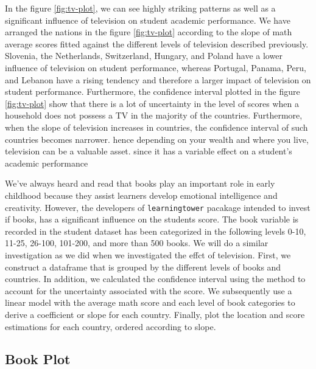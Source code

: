 In the figure \ref{fig:tv-plot}, we can see highly striking patterns as
well as a significant influence of television on student academic
performance. We have arranged the nations in the figure
\ref{fig:tv-plot} according to the slope of math average scores fitted
against the different levels of television described previously.
Slovenia, the Netherlands, Switzerland, Hungary, and Poland have a lower
influence of television on student performance, whereas Portugal,
Panama, Peru, and Lebanon have a rising tendency and therefore a larger
impact of television on student performance. Furthermore, the confidence
interval plotted in the figure \ref{fig:tv-plot} show that there is a
lot of uncertainty in the level of scores when a household does not
possess a TV in the majority of the countries. Furthermore, when the
slope of television increases in countries, the confidence interval of
such countries becomes narrower. hence depending on your wealth and
where you live, television can be a valuable asset. since it has a
variable effect on a student's academic performance

We've always heard and read that books play an important role in early
childhood because they assist learners develop emotional intelligence
and creativity. However, the developers of \texttt{learningtower}
pacakage intended to invest if books, has a significant influence on the
students score. The book variable is recorded in the student dataset has
been categorized in the following levels 0-10, 11-25, 26-100, 101-200,
and more than 500 books. We will do a similar investigation as we did
when we investigated the effct of television. First, we construct a
dataframe that is grouped by the different levels of books and
countries. In addition, we calculated the confidence interval using the
method to account for the uncertainty associated with the score. We
subsequently use a linear model with the average math score and each
level of book categories to derive a coefficient or slope for each
country. Finally, plot the location and score estimations for each
country, ordered according to slope.

\hypertarget{book-plot}{%
\subsection{Book Plot}\label{book-plot}}

